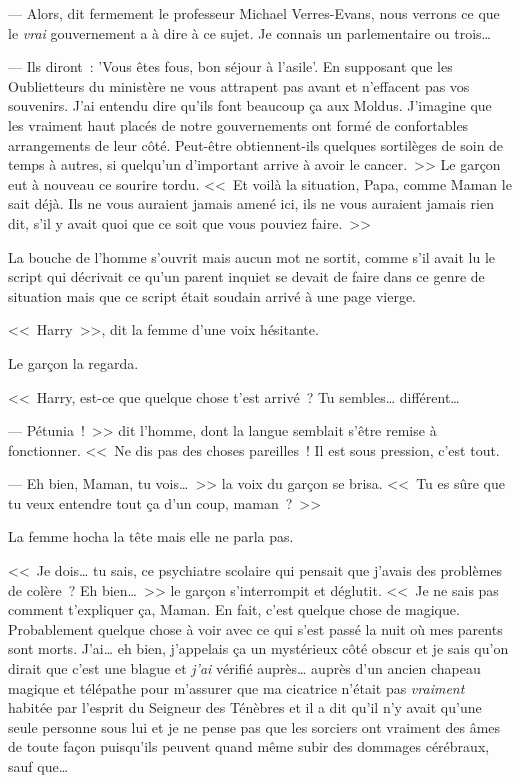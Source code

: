 --- Alors, dit fermement le professeur Michael Verres-Evans, nous verrons ce que le \emph{vrai} gouvernement a à dire à ce sujet. Je connais un parlementaire ou trois…

--- Ils diront~: 'Vous êtes fous, bon séjour à l'asile'. En supposant que les Oublietteurs du ministère ne vous attrapent pas avant et n'effacent pas vos souvenirs. J'ai entendu dire qu'ils font beaucoup ça aux Moldus. J'imagine que les vraiment haut placés de notre gouvernements ont formé de confortables arrangements de leur côté. Peut-être obtiennent-ils quelques sortilèges de soin de temps à autres, si quelqu'un d'important arrive à avoir le cancer.~>> Le garçon eut à nouveau ce sourire tordu. <<~Et voilà la situation, Papa, comme Maman le sait déjà. Ils ne vous auraient jamais amené ici, ils ne vous auraient jamais rien dit, s'il y avait quoi que ce soit que vous pouviez faire.~>>

La bouche de l'homme s'ouvrit mais aucun mot ne sortit, comme s'il avait lu le script qui décrivait ce qu'un parent inquiet se devait de faire dans ce genre de situation mais que ce script était soudain arrivé à une page vierge.

<<~Harry~>>, dit la femme d'une voix hésitante.

Le garçon la regarda.

<<~Harry, est-ce que quelque chose t'est arrivé~? Tu sembles… différent…

--- Pétunia~!~>> dit l'homme, dont la langue semblait s'être remise à fonctionner. <<~Ne dis pas des choses pareilles~! Il est sous pression, c'est tout.

--- Eh bien, Maman, tu vois…~>> la voix du garçon se brisa. <<~Tu es sûre que tu veux entendre tout ça d'un coup, maman~?~>>

La femme hocha la tête mais elle ne parla pas.

<<~Je dois… tu sais, ce psychiatre scolaire qui pensait que j'avais des problèmes de colère~? Eh bien…~>> le garçon s'interrompit et déglutit. <<~Je ne sais pas comment t'expliquer ça, Maman. En fait, c'est quelque chose de magique. Probablement quelque chose à voir avec ce qui s'est passé la nuit où mes parents sont morts. J'ai… eh bien, j'appelais ça un mystérieux côté obscur et je sais qu'on dirait que c'est une blague et \emph{j'ai} vérifié auprès… auprès d'un ancien chapeau magique et télépathe pour m'assurer que ma cicatrice n'était pas \emph{vraiment} habitée par l'esprit du Seigneur des Ténèbres et il a dit qu'il n'y avait qu'une seule personne sous lui et je ne pense pas que les sorciers ont vraiment des âmes de toute façon puisqu'ils peuvent quand même subir des dommages cérébraux, sauf que…

